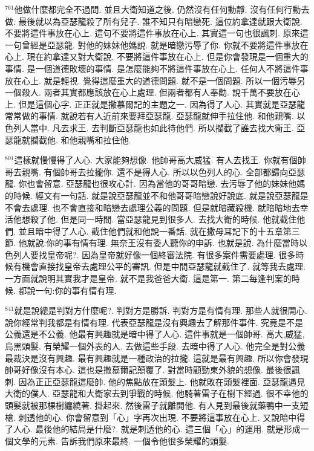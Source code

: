 \documentclass{book}
\begin{document}
$^{761}$他做什麼都完全不過問.
並且大衛知道之後.
仍然沒有任何動靜.
沒有任何行動去做.
最後就以為亞瑟龍殺了所有兒子.
誰不知只有暗戀死.
這位約拿達就跟大衛說.
不要將這件事放在心上.
這句不要將這件事放在心上.
其實這一句也很諷刺.
原來這一句曾經是亞瑟龍.
對他的妹妹他媽說.
就是暗戀污辱了你.
你就不要將這件事放在心上.
現在約拿達又對大衛說.
不要將這件事放在心上.
但是你會發現是一個重大的事情.
是一個道德敗壞的事情.
是怎麼能夠不將這件事放在心上.
任何人不將這件事放在心上.
就是輕視.
覺得這麼重大的道德問題.
就不是一個問題.
所以一個污辱另一個殺人.
兩者其實都應該放在心上處理.
但兩者都有人奉勸.
說千萬不要放在心上.
但是這個心字.
正正就是撒慕爾記的主題之一.
因為得了人心.
其實就是亞瑟龍常常做的事情.
就說若有人近前來要拜亞瑟龍.
亞瑟龍就伸手拉住他.
和他親嘴.
以色列人當中.
凡去求王.
去判斷亞瑟龍也如此待他們.
所以攔截了誰去找大衛王.
亞瑟龍就攔截他.
和他親嘴和拉住他.

$^{801}$這樣就慢慢得了人心.
大家能夠想像.
他帥哥高大威猛.
有人去找王.
你就有個帥哥去親嘴.
有個帥哥去拉攏你.
還不是得人心.
所以以色列人的心.
全部都歸向亞瑟龍.
你也會留意.
亞瑟龍也很攻心計.
因為當他的哥哥暗戀.
去污辱了他的妹妹他媽的時候.
經文有一句話.
就是說亞瑟龍並不和他哥哥暗戀說好說底.
就是說亞瑟龍是不會去處理.
也不會直接和暗戀去處理公義的問題.
但是就暗藏殺機.
就暗暗地去幸活他想殺了他.
但是同一時間.
當亞瑟龍見到很多人.
去找大衛的時候.
他就截住他們.
並且暗中得了人心.
截住他們就和他說一番話.
就在撒母耳記下的十五章第三節.
他就說:你的事有情有理.
無奈王沒有委人聽你的申訴.
也就是說.
為什麼當時以色列人要找皇帝呢?.
因為皇帝就好像一個終審法院.
有很多案件需要處理.
很多時候有機會直接找皇帝去處理公平的審訊.
但是中間亞瑟龍就截住了.
就等我去處理.
一方面就說明其實我才是皇帝.
就不是我爸爸大衛.
這是第一.
第二每逢判案的時候.
都說一句:你的事有情有理.

$^{841}$就是說總是判對方什麼呢?.
判對方是勝訴.
判對方是有情有理.
那些人就很開心.
說你經常判我都是有情有理.
代表亞瑟龍是沒有興趣去了解那件事件.
究竟是不是公義還是不公義.
他最有興趣就是暗中得了人心.
這件事就是一個帥哥.
高大,威猛,烏黑頭髮.
有榮耀一個外表的人.
去做這些手段.
去暗中得了人心.
他完全是對公義最裁決是沒有興趣.
最有興趣就是一種政治的拉攏.
這就是最有興趣.
所以你會發現帥哥好像沒有本心.
這也是撒慕爾記顛覆了.
對當時顧勁東外貌的想像.
最後很諷刺.
因為正正亞瑟龍這麼帥.
他的焦點放在頭髮上.
他就敗在頭髮裡面.
亞瑟龍遇見大衛的僕人.
亞瑟龍和大衛家去到爭戰的時候.
他騎著雷子在樹下經過.
很不幸他的頭髮就被那棵樹纏繞著.
掛起來.
然後雷子就離開他.
有人見到最後就藥鴨中一支短槍.
刺透他的心.
你會留意到「心」字再次出現.
不要將這事放在心上.
又說暗中得了人心.
最後他的結局是什麼?.
就是刺透他的心.
這三個「心」的運用.
就是形成一個文學的元素.
告訴我們原來最終.
一個令他很多榮耀的頭髮.
\end{document}
